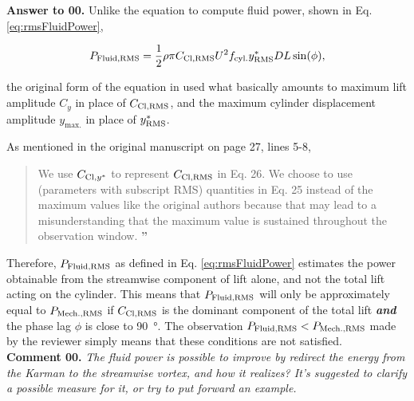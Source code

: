 \documentclass[10pt]{article}
\newcounter{question}
\newcommand{\name}{00}
\newcommand{\question}[1]{\refstepcounter{question} \noindent \textbf{Comment \name.\thequestion}\vskip 0.25cm \noindent \emph{#1}\\}
\newcommand{\answer}[1]{\noindent \textbf{Answer to \name.\thequestion}\vskip 0.25cm \noindent #1 \mbox{}\\}
\begin{document}
\answer{
  Unlike the equation to compute fluid power, shown in Eq. \ref{eq:rmsFluidPower},

  \begin{equation}
    P_{\text{Fluid,RMS}} = \frac{1}{2} \rho \pi C_{\text{Cl},\text{RMS}} U^{2} f_{\text{cyl.}} y^{*}_{\text{RMS}} D L \sin(\phi),
    \label{eq:rmsFluidPower}
  \end{equation}

  \noindent the original form of the equation in \citet{Raghavan2007} used what basically amounts to maximum lift amplitude $C_{y}$ in place of $C_{\text{Cl},\text{RMS}}$, and the maximum cylinder displacement amplitude $y_{\text{max.}}$ in place of $y^{*}_{\text{RMS}}$.

  As mentioned in the original manuscript on page 27, lines 5-8,

  \begin{quotation}
    \noindent {\Large \textbf{``}} We use $C_{\text{Cl},y^{*}}$ to represent $C_{\text{Cl},\text{RMS}}$ in Eq. 26. We choose to use \rms{} (parameters with subscript RMS) quantities in Eq. 25 instead of the maximum values like the original authors because that may lead to a misunderstanding that the maximum value is sustained throughout the observation window. {\Large \textbf{''}}
  \end{quotation}

  \noindent Therefore, $P_{\text{Fluid,RMS}}$ as defined in Eq. \ref{eq:rmsFluidPower} estimates the \rms{} power obtainable from the streamwise component of lift alone, and not the total lift acting on the cylinder. This means that $P_{\text{Fluid,RMS}}$ will only be approximately equal to $P_{\text{Mech.,RMS}}$ if $C_{\text{Cl},\text{RMS}}$ is the dominant component of the total lift \textbf{\textit{and}} the phase lag $\phi$ is close to \SI{90}{\degree}. The observation $P_{\text{Fluid,RMS}} < P_{\text{Mech.,RMS}}$ made by the reviewer simply means that these conditions are not satisfied.
}

\question{The fluid power is possible to improve by redirect the energy from the Karman to the streamwise vortex, and how it realizes? It's suggested to clarify a possible measure for it, or try to put forward an example.}
\end{document}
